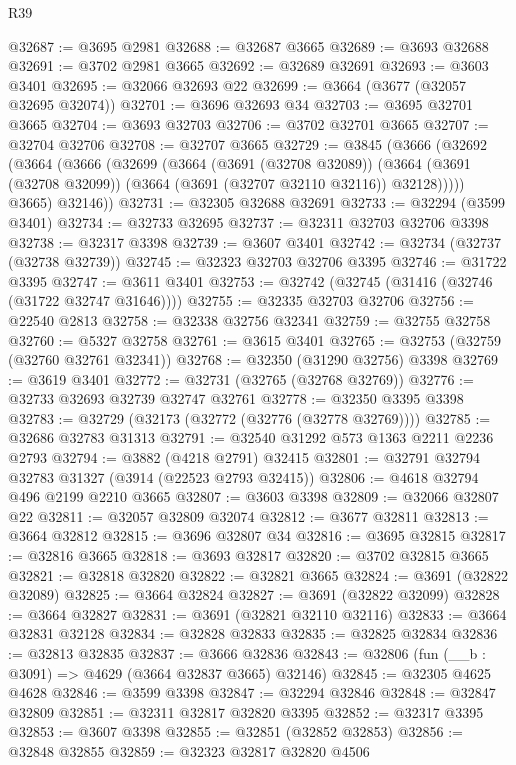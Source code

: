 \begin{lexlean}{R39}
\begin{coremodule}
@32687 := @3695 @2981
@32688 := @32687 @3665
@32689 := @3693 @32688
@32691 := @3702 @2981 @3665
@32692 := @32689 @32691
@32693 := @3603 @3401
@32695 := @32066 @32693 @22
@32699 := @3664 (@3677 (@32057 @32695 @32074))
@32701 := @3696 @32693 @34
@32703 := @3695 @32701 @3665
@32704 := @3693 @32703
@32706 := @3702 @32701 @3665
@32707 := @32704 @32706
@32708 := @32707 @3665
@32729 := @3845
    (@3666
      (@32692
        (@3664
          (@3666
            (@32699
              (@3664
                (@3691 (@32708 @32089))
                (@3664 (@3691 (@32708 @32099)) (@3664 (@3691 (@32707 @32110 @32116)) @32128)))))
          @3665)
        @32146))
@32731 := @32305 @32688 @32691
@32733 := @32294 (@3599 @3401)
@32734 := @32733 @32695
@32737 := @32311 @32703 @32706 @3398
@32738 := @32317 @3398
@32739 := @3607 @3401
@32742 := @32734 (@32737 (@32738 @32739))
@32745 := @32323 @32703 @32706 @3395
@32746 := @31722 @3395
@32747 := @3611 @3401
@32753 := @32742 (@32745 (@31416 (@32746 (@31722 @32747 @31646))))
@32755 := @32335 @32703 @32706
@32756 := @22540 @2813
@32758 := @32338 @32756 @32341
@32759 := @32755 @32758
@32760 := @5327 @32758
@32761 := @3615 @3401
@32765 := @32753 (@32759 (@32760 @32761 @32341))
@32768 := @32350 (@31290 @32756) @3398
@32769 := @3619 @3401
@32772 := @32731 (@32765 (@32768 @32769))
@32776 := @32733 @32693 @32739 @32747 @32761
@32778 := @32350 @3395 @3398
@32783 := @32729 (@32173 (@32772 (@32776 (@32778 @32769))))
@32785 := @32686 @32783 @31313
@32791 := @32540 @31292 @573 @1363 @2211 @2236 @2793
@32794 := @3882 (@4218 @2791) @32415
@32801 := @32791 @32794 @32783 @31327 (@3914 (@22523 @2793 @32415))
@32806 := @4618 @32794 @496 @2199 @2210 @3665
@32807 := @3603 @3398
@32809 := @32066 @32807 @22
@32811 := @32057 @32809 @32074
@32812 := @3677 @32811
@32813 := @3664 @32812
@32815 := @3696 @32807 @34
@32816 := @3695 @32815
@32817 := @32816 @3665
@32818 := @3693 @32817
@32820 := @3702 @32815 @3665
@32821 := @32818 @32820
@32822 := @32821 @3665
@32824 := @3691 (@32822 @32089)
@32825 := @3664 @32824
@32827 := @3691 (@32822 @32099)
@32828 := @3664 @32827
@32831 := @3691 (@32821 @32110 @32116)
@32833 := @3664 @32831 @32128
@32834 := @32828 @32833
@32835 := @32825 @32834
@32836 := @32813 @32835
@32837 := @3666 @32836
@32843 := @32806 (fun (__b : @3091) => @4629 (@3664 @32837 @3665) @32146)
@32845 := @32305 @4625 @4628
@32846 := @3599 @3398
@32847 := @32294 @32846
@32848 := @32847 @32809
@32851 := @32311 @32817 @32820 @3395
@32852 := @32317 @3395
@32853 := @3607 @3398
@32855 := @32851 (@32852 @32853)
@32856 := @32848 @32855
@32859 := @32323 @32817 @32820 @4506

\end{coremodule}
\end{lexlean}
